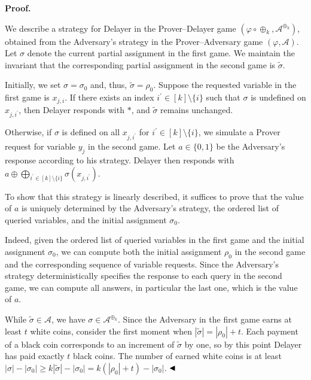 \documentclass[10pt,a4paper]{article}
\begin{document}
\par\medskip\noindent\textbf{Proof.}\par


We describe a strategy for Delayer in the Prover–Delayer game $(\varphi\circ\oplus_{k},\mathcal{A}^{\oplus_{k}})$, obtained from the Adversary’s strategy in the Prover–Adversary game
$(\varphi,\mathcal{A})$.
Let $\sigma$ denote the current partial assignment in the first game.
We maintain the invariant that the corresponding partial assignment in the second game is
$\tilde{\sigma}$.\par



Initially, we set $\sigma=\sigma_{0}$ and, thus, $\tilde{\sigma}=\rho_{0}$.
Suppose the requested variable in the first game is $x_{j,i}$.
If there exists an index $i^{\prime}\in[k]\setminus\{i\}$ such that $\sigma$ is undefined on
$x_{j,i^{\prime}}$, then Delayer responds with $*$, and $\tilde{\sigma}$ remains unchanged.\par



Otherwise, if $\sigma$ is defined on all $x_{j,i^{\prime}}$ for $i^{\prime}\in[k]\setminus\{i\}$,
we simulate a Prover request for variable $y_{j}$ in the second game.
Let $a\in\{0,1\}$ be the Adversary’s response according to his strategy.
Delayer then responds with $a\oplus\bigoplus_{i^{\prime}\in[k]\setminus\{i\}}\sigma(x_{j,i^{\prime}})$.\par



To show that this strategy is linearly described, it suffices to prove that the value of $a$
is uniquely determined by the Adversary’s strategy, the ordered list of queried variables,
and the initial assignment $\sigma_{0}$.\par



Indeed, given the ordered list of queried variables in the first game and the initial assignment
$\sigma_{0}$, we can compute both the initial assignment $\rho_{0}$ in the second game and
the corresponding sequence of variable requests.
Since the Adversary’s strategy deterministically specifies the response to each query in
the second game, we can compute all answers, in particular the last one, which is the value of $a$.\par



While $\tilde{\sigma}\in\mathcal{A}$, we have $\sigma\in\mathcal{A}^{\oplus_{k}}$.
Since the Adversary in the first game earns at least $t$ white coins, consider the first
moment when $|\tilde{\sigma}|=|\rho_{0}|+t$.
Each payment of a black coin corresponds to an increment of $\tilde{\sigma}$ by one,
so by this point Delayer has paid exactly $t$ black coins.
The number of earned white coins is at least $|\sigma|-|\sigma_{0}|\geq k|\tilde{\sigma}|-|\sigma_{0}|=k(|\rho_{0}|+t)-|\sigma_{0}|$.
$\hfill\blacktriangleleft$\par
\end{document}
